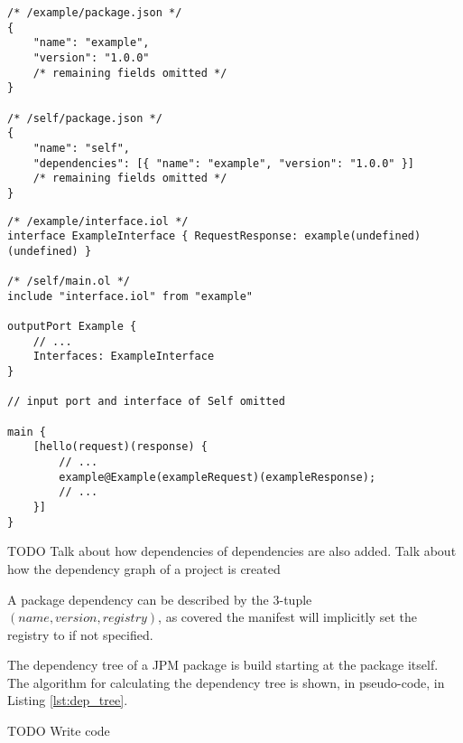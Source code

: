 \begin{listing}[H]
\begin{verbatim}
/* /example/package.json */
{
    "name": "example",
    "version": "1.0.0"
    /* remaining fields omitted */
}

/* /self/package.json */
{
    "name": "self",
    "dependencies": [{ "name": "example", "version": "1.0.0" }]
    /* remaining fields omitted */
}
\end{verbatim}

\begin{verbatim}
/* /example/interface.iol */
interface ExampleInterface { RequestResponse: example(undefined)(undefined) }

/* /self/main.ol */
include "interface.iol" from "example"

outputPort Example {
    // ...
    Interfaces: ExampleInterface
}

// input port and interface of Self omitted

main {
    [hello(request)(response) {
        // ...
        example@Example(exampleRequest)(exampleResponse);
        // ...
    }]
}
\end{verbatim}
\caption{}
\label{lst:jolie_dep_package}
\end{listing}

TODO Talk about how dependencies of dependencies are also added. Talk about how
the dependency graph of a project is created

A package dependency can be described by the 3-tuple $(name, version,
registry)$, as covered the manifest will implicitly set the registry to
 if not specified.


The dependency tree of a JPM package is build starting at the package itself.
The algorithm for calculating the dependency tree is shown, in pseudo-code, in
Listing \ref{lst:dep_tree}.

TODO Write code
